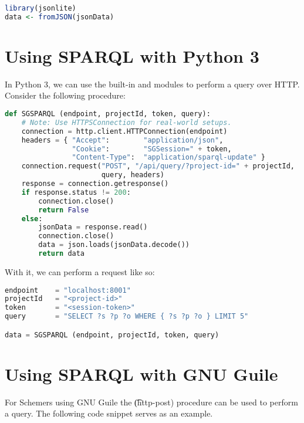 \begin{lstlisting}[language=R]
library(jsonlite)
data <- fromJSON(jsonData)
\end{lstlisting}

\section{Using SPARQL with Python 3}

  In Python 3, we can use the built-in  and 
  modules to perform a query over HTTP.  Consider the following procedure:

\begin{lstlisting}[language=Python]
def SGSPARQL (endpoint, projectId, token, query):
    # Note: Use HTTPSConnection for real-world setups.
    connection = http.client.HTTPConnection(endpoint)
    headers = { "Accept":        "application/json",
                "Cookie":        "SGSession=" + token,
                "Content-Type":  "application/sparql-update" }
    connection.request("POST", "/api/query/?project-id=" + projectId,
                       query, headers)
    response = connection.getresponse()
    if response.status != 200:
        connection.close()
        return False
    else:
        jsonData = response.read()
        connection.close()
        data = json.loads(jsonData.decode())
        return data
\end{lstlisting}

  With it, we can perform a request like so:

\begin{lstlisting}[language=Python]
endpoint    = "localhost:8001"
projectId   = "<project-id>"
token       = "<session-token>"
query       = "SELECT ?s ?p ?o WHERE { ?s ?p ?o } LIMIT 5"

data = SGSPARQL (endpoint, projectId, token, query)
\end{lstlisting}

\section{Using SPARQL with GNU Guile}
\label{sec:sparql-with-guile}

  For Schemers using GNU Guile the \t{(http-post)} procedure can be used
  to perform a query.  The following code snippet serves as an example.

